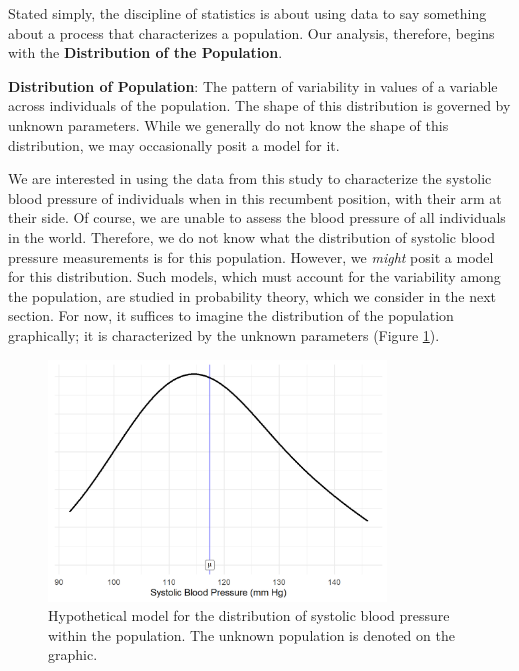 \documentclass[
]{book}
\theoremstyle{plain}
\theoremstyle{mydefn}
\theoremstyle{myexmpl}
\theoremstyle{remark}
\begin{document}
Stated simply, the discipline of statistics is about using data to say something about a process that characterizes a population. Our analysis, therefore, begins with the \textbf{Distribution of the Population}.

\begin{rmdfivefund}
\textbf{Distribution of Population}: The pattern of variability in values of a variable across individuals of the population. The shape of this distribution is governed by unknown parameters. While we generally do not know the shape of this distribution, we may occasionally posit a model for it.
\end{rmdfivefund}

We are interested in using the data from this study to characterize the systolic blood pressure of individuals when in this recumbent position, with their arm at their side. Of course, we are unable to assess the blood pressure of all individuals in the world. Therefore, we do not know what the distribution of systolic blood pressure measurements is for this population. However, we \emph{might} posit a model for this distribution. Such models, which must account for the variability among the population, are studied in probability theory, which we consider in the next section. For now, it suffices to imagine the distribution of the population graphically; it is characterized by the unknown parameters (Figure \ref{fig:distributional-quartet-population}).

\begin{figure}

{\centering \includegraphics[width=0.8\textwidth]{./Images/distributional-quartet-population-1} 

}

\caption{Hypothetical model for the distribution of systolic blood pressure within the population. The unknown population is denoted on the graphic.}\label{fig:distributional-quartet-population}
\end{figure}
\end{document}
